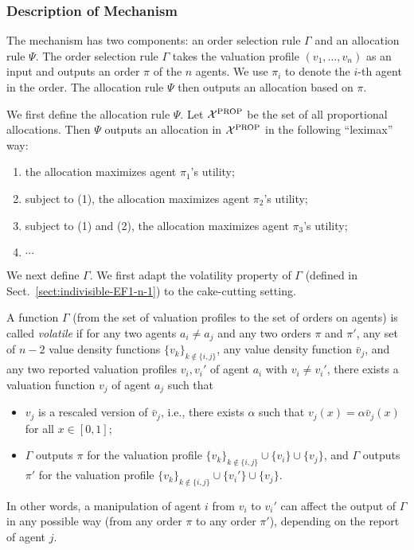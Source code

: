 \subsubsection{Description of Mechanism}
The mechanism has two components: an order selection rule $\Gamma$ and an allocation rule $\Psi$.
The order selection rule $\Gamma$ takes the valuation profile $(v_1,\ldots,v_n)$ as an input and outputs an order $\pi$ of the $n$ agents.
We use $\pi_i$ to denote the $i$-th agent in the order.
The allocation rule $\Psi$ then outputs an allocation based on $\pi$.

We first define the allocation rule $\Psi$.
Let $\mathcal{X}^{\mathrm{PROP}}$ be the set of all proportional allocations.
Then $\Psi$ outputs an allocation in $\mathcal{X}^{\mathrm{PROP}}$ in the following ``leximax'' way:
\begin{enumerate}
    \item the allocation maximizes agent $\pi_1$'s utility;
    \item subject to (1), the allocation maximizes agent $\pi_2$'s utility;
    \item subject to (1) and (2), the allocation maximizes agent $\pi_3$'s utility;
    \item $\cdots$
\end{enumerate}

We next define $\Gamma$.
We first adapt the volatility property of $\Gamma$ (defined in Sect.~\ref{sect:indivisible-EF1-n-1}) to the cake-cutting setting.

\begin{definition}
A function $\Gamma$ (from the set of valuation profiles to the set of orders on agents) is called \emph{volatile} if for any two agents $a_i\neq a_j$ and any two orders $\pi$ and $\pi'$, any set of $n-2$ value density functions $\{v_k\}_{k\notin\{i,j\}}$, any value density function $\bar{v}_j$, and any two reported valuation profiles $v_i,v_i'$ of agent $a_i$ with $v_i\neq v_i'$, there exists a valuation function $v_j$ of agent $a_j$ such that
\begin{itemize}

    \item $v_j$ is a rescaled version of $\bar{v}_j$, i.e., there exists $\alpha$ such that $v_j(x)=\alpha\bar{v}_j(x)$ for all $x\in[0,1]$;
    
    \item $\Gamma$ outputs $\pi$ for the valuation profile $\{v_k\}_{k\notin\{i,j\}}\cup\{v_i\}\cup\{v_j\}$, and $\Gamma$ outputs $\pi'$ for the valuation profile $\{v_k\}_{k\notin\{i,j\}}\cup\{v_i'\}\cup\{v_j\}$.
\end{itemize}

In other words, a manipulation of agent $i$ from $v_i$ to $v_i'$ can affect the output of $\Gamma$ in any possible way (from any order $\pi$ to any order $\pi'$), depending on the report of agent $j$.
\end{definition}



